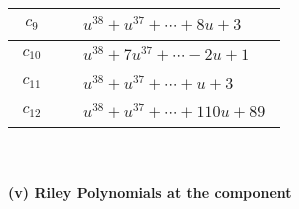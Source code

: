 \documentclass[1p]{elsarticle_modified}
\theoremstyle{definition}
\begin{document}
\begin{tabular}{m{50pt}|m{274pt}}
\hline $$\begin{aligned}c_{9}\end{aligned}$$&$\begin{aligned}
&u^{38}+u^{37}+\cdots+8 u+3
\end{aligned}$\\
\hline $$\begin{aligned}c_{10}\end{aligned}$$&$\begin{aligned}
&u^{38}+7 u^{37}+\cdots-2 u+1
\end{aligned}$\\
\hline $$\begin{aligned}c_{11}\end{aligned}$$&$\begin{aligned}
&u^{38}+u^{37}+\cdots+u+3
\end{aligned}$\\
\hline $$\begin{aligned}c_{12}\end{aligned}$$&$\begin{aligned}
&u^{38}+u^{37}+\cdots+110 u+89
\end{aligned}$\\
\hline
\end{tabular}\\~\\
\newpage\renewcommand{\arraystretch}{1}
\flushleft \textbf{(v) Riley Polynomials at the component}\newline \\
\end{document}
